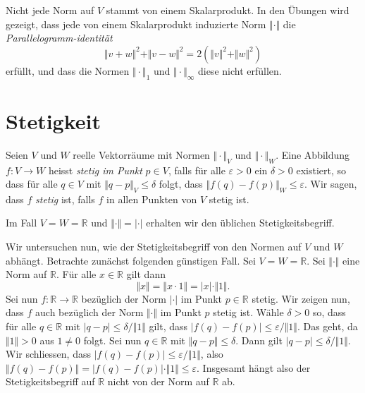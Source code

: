 \documentclass[../main.tex]{subfiles}
\begin{document}
\begin{remark}
  Nicht jede Norm auf $V$ stammt von einem Skalarprodukt.
  In den Übungen wird gezeigt, dass jede von einem Skalarprodukt
  induzierte Norm $\Vert \cdot \Vert$ die
  \emph{Parallelogramm-identität}
  \[
    \Vert v + w \Vert^2 + \Vert v - w \Vert^2
    = 2(\Vert v \Vert^2 + \Vert w \Vert^2)
  \]
  erfüllt, und dass die Normen $\Vert \cdot \Vert_1$
  und $\Vert \cdot \Vert_{\infty}$ diese nicht erfüllen.
\end{remark}

\section{Stetigkeit}\label{sec:continuity}
\begin{definition}
  Seien $V$ und $W$ reelle Vektorräume mit Normen $\Vert \cdot \Vert_V$
  und
  $ \Vert \cdot \Vert_W$.
  Eine Abbildung $f \colon V \to W$ heisst \emph{stetig
  im Punkt} $p \in V$, falls für alle $\varepsilon > 0$
  ein $\delta > 0$ existiert, so dass für alle
  $q \in V$ mit $\Vert q - p \Vert_V \leq \delta$
  folgt, dass
  $\Vert f(q) - f(p) \Vert_W \leq \varepsilon$.
  Wir sagen, dass $f$ \emph{stetig} ist, falls
  $f$ in allen Punkten von $V$ stetig ist.
\end{definition}

\begin{example}
  Im Fall $V = W = \mathbb{R}$ und $\Vert \cdot \Vert = \vert \cdot \vert$
  erhalten wir den üblichen Stetigkeitsbegriff.
\end{example}

Wir untersuchen nun,
wie der Stetigkeitsbegriff von den Normen
auf  $V$ und $W$ abhängt.
Betrachte zunächst folgenden günstigen Fall.
Sei $V = W = \mathbb{R}$. Sei $\Vert \cdot \Vert$
eine Norm auf $\mathbb{R}$.
Für alle $x \in \mathbb{R}$ gilt dann
\[
  \Vert x \Vert = \Vert x \cdot 1 \Vert = |x| \cdot \Vert 1 \Vert.
\]
Sei nun $f \colon \mathbb{R} \to \mathbb{R}$
bezüglich der Norm $| \cdot |$ im Punkt $p \in \mathbb{R}$ stetig.
Wir zeigen nun, dass $f$ auch bezüglich der Norm $\Vert \cdot \Vert$
im Punkt $p$ stetig ist.
Wähle $\delta > 0$ so, dass für alle $q \in \mathbb{R}$
mit $|q - p| \leq \delta/\Vert 1 \Vert$ gilt,
dass $|f(q) - f(p)| \leq \varepsilon/\Vert 1 \Vert$.
Das geht, da $\Vert 1 \Vert > 0$ aus $1 \neq 0$ folgt.
Sei nun $q \in \mathbb{R}$ mit $\Vert q - p \Vert \leq \delta$.
Dann gilt $|q - p| \leq \delta / \Vert 1 \Vert$.
Wir schliessen, dass $|f(q) - f(p)| \leq \varepsilon/\Vert 1 \Vert$,
also
$\Vert f(q) - f(p) \Vert = |f(q) - f(p)| \cdot \Vert 1 \Vert \leq \varepsilon$.
Insgesamt hängt also der Stetigkeitsbegriff auf $\mathbb{R}$ nicht von
der Norm auf $\mathbb{R}$ ab.
\end{document}
